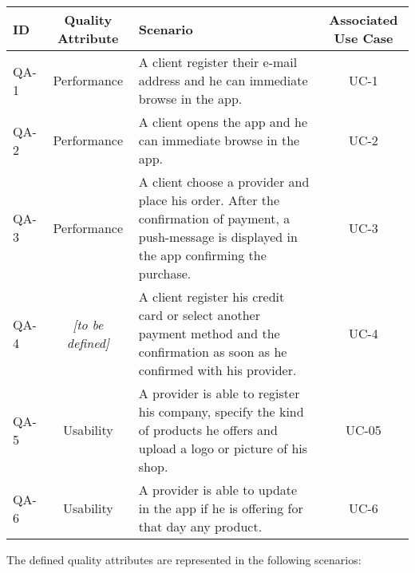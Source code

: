 \begin{table}[H]
\begin{tabularx}{\textwidth}{lcXc}
    \toprule
    ID & Quality Attribute & Scenario & Associated Use Case  \\
    \midrule
    QA-1 & Performance & A client register their e-mail address and he can immediate browse in the app. & UC-1 \\
    QA-2 & Performance & A client opens the app and he can immediate browse in the app. & UC-2 \\
    QA-3 & Performance & A client choose a provider and place his order. After the confirmation
    of payment, a push-message is displayed in the app confirming the purchase. & UC-3 \\
    QA-4 & \textit{[to be defined]} & A client register his credit card or select another payment method and the
    confirmation as soon as he confirmed with his provider. & UC-4 \\
    QA-5 & Usability & A provider is able to register his company, specify the kind of products he offers and upload
    a logo or picture of his shop. & UC-05 \\
    QA-6 & Usability & A provider is able to update in the app if he is offering for that day any product. &  UC-6 \\
    \bottomrule
\end{tabularx}
\end{table}

The defined quality attributes are represented in the following scenarios:

